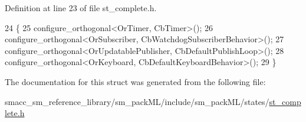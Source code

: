 Definition at line 23 of file st\+\_\+complete.\+h.


\begin{DoxyCode}
24     \{
25         configure\_orthogonal<OrTimer, CbTimer>();   
26         configure\_orthogonal<OrSubscriber, CbWatchdogSubscriberBehavior>();
27         configure\_orthogonal<OrUpdatablePublisher, CbDefaultPublishLoop>();
28         configure\_orthogonal<OrKeyboard, CbDefaultKeyboardBehavior>();
29     \}
\end{DoxyCode}


The documentation for this struct was generated from the following file\+:\begin{DoxyCompactItemize}
\item 
smacc\+\_\+sm\+\_\+reference\+\_\+library/sm\+\_\+pack\+M\+L/include/sm\+\_\+pack\+M\+L/states/\hyperlink{st__complete_8h}{st\+\_\+complete.\+h}\end{DoxyCompactItemize}
